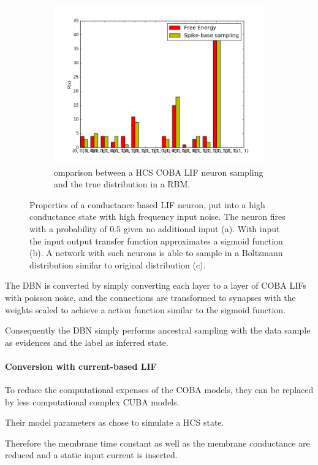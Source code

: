 \begin{figure}
\begin{subfigure}[t]{.5\textwidth}
  		\centering
  		\includegraphics[width=.8\linewidth]{imgs/coba_lif_bm2.png}
  		\caption{omparison between a HCS COBA LIF neuron sampling and the true distribution in a RBM.}
  		\label{fig:sub2}
	\end{subfigure}
	\caption{Properties of a conductance based LIF neuron, put into a high conductance state with high frequency input noise. The neuron fires with a probability of $0.5$ given no additional input (a). With input the input output transfer function approximates a sigmoid function (b). A network with such neurons is able to sample in a Boltzmann distribution similar to original distribution (c). }
	\label{fig:cobahcs}

\end{figure}
  
The DBN is converted by simply converting each layer to a layer of COBA LIFs with poisson noise, and the connections are transformed to synapses with the weights scaled to achieve a action function similar to the sigmoid function.

Consequently the DBN simply performs ancestral sampling with the data sample as evidences and the label as inferred state.   


\paragraph{Conversion with current-based LIF}

To reduce the computational expenses of the COBA models, they can be replaced by less computational complex CUBA models.

Their model parameters as chose to simulate a HCS state.

Therefore the membrane time constant as well as the membrane conductance are reduced and a static input current is inserted.  

